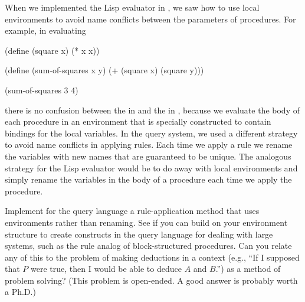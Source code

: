 \begin{exercise}
	\label{Exercise 4.79}
	When we implemented the Lisp evaluator in , we saw how to use local environments to avoid name conflicts between the parameters of procedures.
	For example, in evaluating
	\begin{scheme}
	  (define (square x) (* x x))

	  (define (sum-of-squares x y)
	    (+ (square x) (square y)))

	  (sum-of-squares 3 4)
	\end{scheme}
	there is no confusion between the  in  and the  in , because we evaluate the body of each procedure in an environment that is specially constructed to contain bindings for the local variables.
	In the query system, we used a different strategy to avoid name conflicts in applying rules.
	Each time we apply a rule we rename the variables with new names that are guaranteed to be unique.
	The analogous strategy for the Lisp evaluator would be to do away with local environments and simply rename the variables in the body of a procedure each time we apply the procedure.

	Implement for the query language a rule-application method that uses environments rather than renaming.
	See if you can build on your environment structure to create constructs in the query language for dealing with large systems, such as the rule analog of block-structured procedures.
	Can you relate any of this to the problem of making deductions in a context (e.g., “If I supposed that \( P \) were true, then I would be able to deduce \( A \) and \( B \).”) as a method of problem solving?
	(This problem is open-ended.
	A good answer is probably worth a Ph.D.)
\end{exercise}
